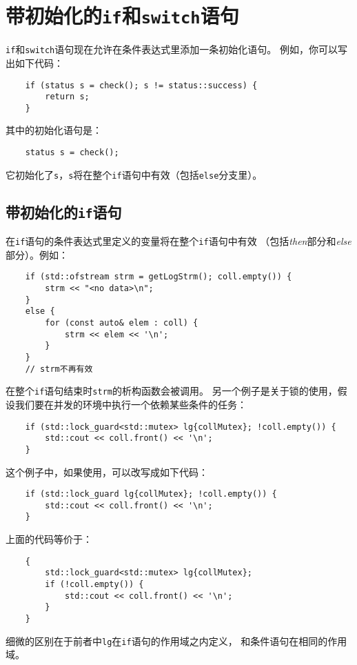 \chapter{带初始化的\texttt{if}和\texttt{switch}语句}\label{ch2}
\texttt{if}和\texttt{switch}语句现在允许在条件表达式里添加一条初始化语句。
例如，你可以写出如下代码：
\begin{lstlisting}
    if (status s = check(); s != status::success) {
        return s;
    }
\end{lstlisting}
其中的初始化语句是：
\begin{lstlisting}
    status s = check();
\end{lstlisting}
它初始化了\texttt{s}，\texttt{s}将在整个\texttt{if}语句中有效（包括\texttt{else}分支里）。

\section{带初始化的\texttt{if}语句}\label{ch2.1}
在\texttt{if}语句的条件表达式里定义的变量将在整个\texttt{if}语句中有效
（包括\emph{then}部分和\emph{else}部分）。例如：
\begin{lstlisting}
    if (std::ofstream strm = getLogStrm(); coll.empty()) {
        strm << "<no data>\n";
    }
    else {
        for (const auto& elem : coll) {
            strm << elem << '\n';
        }
    }
    // strm不再有效
\end{lstlisting}
在整个\texttt{if}语句结束时\texttt{strm}的析构函数会被调用。
另一个例子是关于锁的使用，假设我们要在并发的环境中执行一个依赖某些条件的任务：
\begin{lstlisting}
    if (std::lock_guard<std::mutex> lg{collMutex}; !coll.empty()) {
        std::cout << coll.front() << '\n';
    }
\end{lstlisting}
这个例子中，如果使用，可以改写成如下代码：
\begin{lstlisting}
    if (std::lock_guard lg{collMutex}; !coll.empty()) {
        std::cout << coll.front() << '\n';
    }
\end{lstlisting}
上面的代码等价于：
\begin{lstlisting}
    {
        std::lock_guard<std::mutex> lg{collMutex};
        if (!coll.empty()) {
            std::cout << coll.front() << '\n';
        }
    }
\end{lstlisting}
细微的区别在于前者中\texttt{lg}在\texttt{if}语句的作用域之内定义，
和条件语句在相同的作用域。

